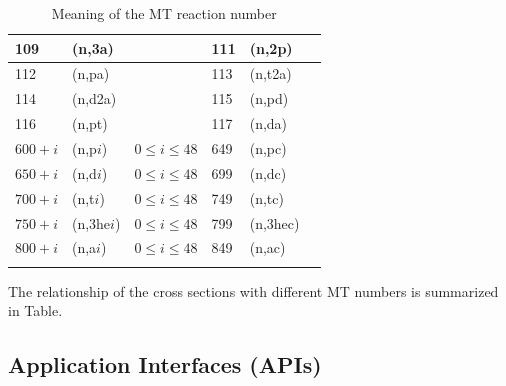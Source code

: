 \begin{small}
\begin{longtable}{l l p{3.5cm} | l l p{3.5cm}}
109 & (n,3a) & & 111 & (n,2p) & \\\hline
112 & (n,pa) & & 113 & (n,t2a) & \\\hline
114 & (n,d2a) & & 115 & (n,pd) & \\\hline
116 & (n,pt) & & 117 & (n,da) & \\\hline
$600+i$ & (n,p$i$) & $0\leq i\leq 48$ & 649 & (n,pc) & \\\hline
$650+i$ & (n,d$i$) & $0\leq i\leq 48$ & 699 & (n,dc) & \\\hline
$700+i$ & (n,t$i$) & $0\leq i\leq 48$ & 749 & (n,tc) & \\\hline
$750+i$ & (n,3he$i$) & $0\leq i\leq 48$ & 799 & (n,3hec) & \\\hline
$800+i$ & (n,a$i$) & $0\leq i\leq 48$ & 849 & (n,ac) & \\\hline
\caption{Meaning of the MT reaction number}
\label{tab:mt-meaning}
\end{longtable}
\end{small}

The relationship of the cross sections with different MT numbers is summarized in Table.

\subsection{Application Interfaces (APIs)}
